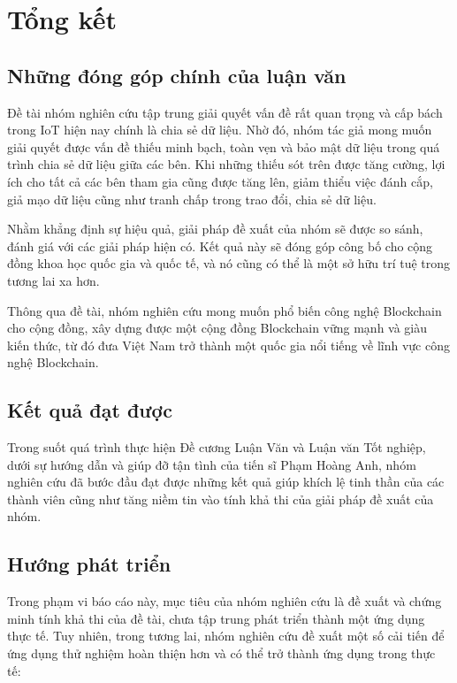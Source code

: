 \chapter{Tổng kết}\label{chap:conclusion}
\section{Những đóng góp chính của luận văn}
Đề tài nhóm nghiên cứu tập trung giải quyết vấn đề rất quan trọng và cấp bách trong IoT hiện nay chính là chia sẻ dữ liệu. Nhờ đó, nhóm tác giả mong muốn giải quyết được vấn đề thiếu minh bạch, toàn vẹn và bảo mật dữ liệu trong quá trình chia sẻ dữ liệu giữa các bên. Khi những thiếu sót trên được tăng cường, lợi ích cho tất cả các bên tham gia cũng được tăng lên, giảm thiểu việc đánh cắp, giả mạo dữ liệu cũng như tranh chấp trong trao đổi, chia sẻ dữ liệu. \par
Nhằm khẳng định sự hiệu quả, giải pháp đề xuất của nhóm sẽ được so sánh, đánh giá với các giải pháp hiện có. Kết quả này sẽ đóng góp công bố cho cộng đồng khoa học quốc gia và quốc tế, và nó cũng có thể là một sở hữu trí tuệ trong tương lai xa hơn.\par
Thông qua đề tài, nhóm nghiên cứu mong muốn phổ biến công nghệ
Blockchain cho cộng đồng, xây dựng được một cộng đồng Blockchain vững mạnh và giàu kiến thức, từ đó đưa Việt Nam trở thành một quốc gia nổi tiếng về lĩnh vực công nghệ Blockchain.
\section{Kết quả đạt được}
Trong suốt quá trình thực hiện Đề cương Luận Văn và Luận văn Tốt nghiệp, dưới sự hướng dẫn và giúp đỡ tận tình của tiến sĩ Phạm Hoàng Anh, nhóm nghiên cứu đã bước đầu đạt được những kết quả giúp khích lệ tinh thần của các thành viên cũng như tăng niềm tin vào tính khả thi của giải pháp đề xuất của nhóm.
\section{Hướng phát triển}
Trong phạm vi báo cáo này, mục tiêu của nhóm nghiên cứu là đề xuất và chứng minh tính khả thi của đề tài, chưa tập trung phát triển thành một ứng dụng thực tế. Tuy nhiên, trong tương lai, nhóm nghiên cứu đề xuất một số cải tiến để ứng dụng thử nghiệm hoàn thiện hơn và có thể trở thành ứng dụng trong thực tế:
    
